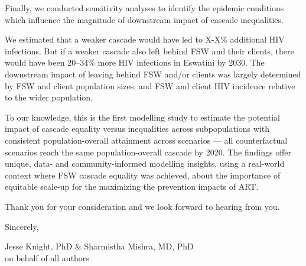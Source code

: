 Finally, we conducted sensitivity analyses to identify the epidemic conditions which influence the magnitude of downstream impact of cascade inequalities.
\par
We estimated that a weaker cascade would have led to X-X\% additional HIV infections. 
But if a weaker cascade also left behind FSW and their clients, there would have been 
20--34\% more HIV infections in Eswatini by 2030.  
The downstream impact of 
leaving behind FSW and/or clients was largely determined by
FSW and client population sizes, and FSW and client HIV incidence relative to the wider population.
\par\pagebreak %
To our knowledge, this is the first modelling study to estimate
the potential impact of cascade equality versus inequalities across subpopulations
with consistent population-overall attainment across scenarios ---
\ie all counterfactual scenarios reach the same population-overall cascade by 2020.
The findings offer unique, data- and community-informed modelling insights,
using a real-world context where FSW cascade equality was achieved,
about the importance of equitable scale-up
for the maximizing the prevention impacts of ART.
\par
Thank you for your consideration and we look forward to hearing from you.
\medskip\par
Sincerely,
\par
Jesse Knight, PhD \& Sharmistha Mishra, MD, PhD\\
on behalf of all authors
